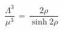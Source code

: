 \begin{equation}
\label{cond1}
\frac{\Lambda^3}{\mu^3} \,= \, \frac{2 \rho}{\sinh 2 \rho}
\end{equation}

